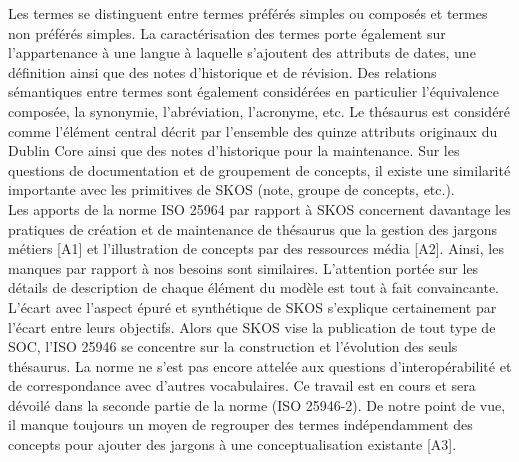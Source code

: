 Les termes se distinguent entre termes préférés simples ou composés et termes non préférés simples. 
La caractérisation des termes porte également sur l'appartenance à une langue à laquelle s'ajoutent des attributs de dates, une définition ainsi que des notes d'historique et de révision. 
Des relations sémantiques entre termes sont également considérées en particulier l'équivalence composée, la synonymie, l'abréviation, l'acronyme, etc. 
Le thésaurus est considéré comme l'élément central décrit par l'ensemble des quinze attributs originaux du Dublin Core ainsi que des notes d'historique pour la maintenance. 
Sur les questions de documentation et de groupement de concepts, il existe une similarité importante avec les primitives de SKOS (note, groupe de concepts, etc.).\\

Les apports de la norme ISO 25964 par rapport à SKOS concernent davantage les pratiques de création et de maintenance de thésaurus que la gestion des jargons métiers [A1] et l'illustration de concepts par des ressources média [A2]. 
Ainsi, les manques par rapport à nos besoins sont similaires. L'attention portée sur les détails de description de chaque élément du modèle est tout à fait convaincante. 
L'écart avec l'aspect épuré et synthétique de SKOS s'explique certainement par l'écart entre leurs objectifs. 
Alors que SKOS vise la publication de tout type de SOC, l'ISO 25946 se concentre sur la construction et l'évolution des seuls thésaurus. 
La norme ne s'est pas encore attelée aux questions d'interopérabilité et de correspondance avec d'autres vocabulaires. Ce travail est en cours et sera dévoilé dans la seconde partie de la norme (ISO 25946-2). 
De notre point de vue, il manque toujours un moyen de regrouper des termes indépendamment des concepts pour ajouter des jargons à une conceptualisation existante [A3].


